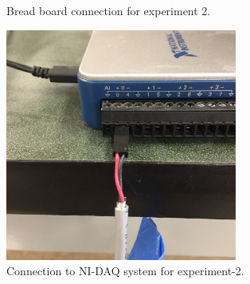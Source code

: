 \documentclass{article} %
\begin{document}
\begin{figure}%
\centering
{}%
\qquad
{}%
\caption{Bread board connection for experiment 2.}
\end{figure}

\begin{figure}[!ht]
\centering
\includegraphics[width=3.00in]{Fig03.png}
\caption{Connection to NI-DAQ system for experiment-2.}
\label{fig:fig02}
\end{figure}
\end{document}
